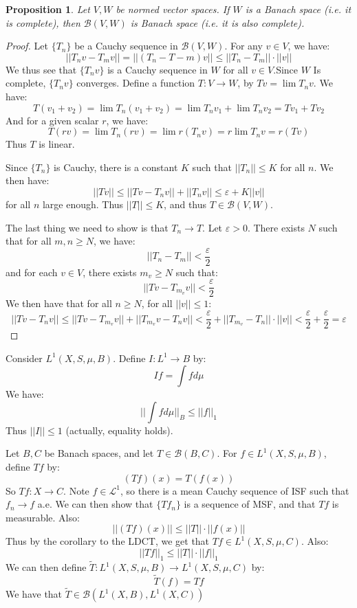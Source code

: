 \documentclass[a4paper,12pt]{report}
\newcommand{\ms}[1]{\mathscr{#1}}
\newcommand{\varep}{ \varepsilon }
\newtheorem{prop}[theorem]{Proposition}
\newenvironment{example}[1][Example.]{\begin{trivlist}
\item[\hskip \labelsep {\bfseries #1}]}{\end{trivlist}}
\begin{document}
	\begin{prop}
	Let $V, W$ be normed vector spaces. If $W$ is a Banach space (i.e. it is complete), then $\ms{B}(V, W)$ is Banach space (i.e. it is also complete).
	\end{prop}
	\begin{proof}
	Let $\{T_n\}$ be a Cauchy sequence in $\ms{B}(V, W)$. For any $v \in V$, we have:
	\[ ||T_nv - T_mv|| = ||(T_n - T-m)v|| \leq ||T_n - T_m|| \cdot ||v|| \]
	We thus see that $\{T_n v\}$ is a Cauchy sequence in $W$ for all $v \in V$.Since $W$ Is complete, $\{T_n v\}$ converges. Define a function $T : V \rightarrow W$, by $Tv = \lim T_n v$. We have:
	\[ T(v_1 + v_2) = \lim T_n(v_1 + v_2) = \lim T_nv_1 + \lim T_nv_2 = Tv_1 + Tv_2 \]
	And for a given scalar $r$, we have:
	\[ T(rv) = \lim T_n(rv) = \lim r(T_nv) = r \lim T_nv = r(Tv) \]
	Thus $T$ is linear.
	
	Since $\{T_n\}$ is Cauchy, there is a constant $K$ such that $||T_n|| \leq K$ for all $n$. We then have:
	\[ ||Tv|| \leq ||Tv - T_nv|| + ||T_nv|| \leq \varep + K||v|| \]
	for all $n$ large enough. Thus $||T|| \leq K$, and thus $T \in \ms{B}(V, W)$. 
	
	The last thing we need to show is that $T_n \rightarrow T$. Let $\varep > 0$. There exists $N$ such that for all $m, n \geq N$, we have:
	\[ ||T_n - T_m|| < \frac{\varep}{2} \]
	and for each $v \in V$, there exists $m_v \geq N$ such that:
	\[ ||Tv - T_{m_v}v|| < \frac{\varep}{2} \]
	We then have that for all $n \geq N$, for all $||v|| \leq 1$:
	\[ ||Tv - T_n v|| \leq ||Tv - T_{m_v}v|| + ||T_{m_v}v - T_nv|| < \frac{\varep}{2} + ||T_{m_v} - T_n|| \cdot ||v|| < \frac{\varep}{2} + \frac{\varep}{2} = \varep \]
	\end{proof}
	
	\begin{example}
	Consider $L^1(X, S, \mu, B)$. Define $I : L^1 \rightarrow B$ by:
	\[ If = \int f  d\mu \]
	We have:
	\[ ||\int f d\mu ||_B \leq ||f||_1 \]
	Thus $||I|| \leq 1$ (actually, equality holds).
	\end{example}

	\begin{example}
	Let $B, C$ be Banach spaces, and let $T \in \ms{B}(B, C)$. For $f \in L^1(X, S, \mu, B)$, define $Tf$ by:
	\[ (Tf)(x) = T(f(x)) \]
	So $Tf : X \rightarrow C$. Note $f \in \ms{L}^1$, so there is a mean Cauchy sequence of ISF such that $f_n \rightarrow f$ a.e. We can then show that $\{Tf_n\}$ is a sequence of MSF, and that $Tf$ is measurable. Also:
	\[ ||(Tf)(x)|| \leq ||T|| \cdot ||f(x)|| \]
	Thus by the corollary to the LDCT, we get that $Tf \in L^1(X, S, \mu, C)$. Also:
	\[ ||Tf||_1 \leq ||T|| \cdot ||f||_1 \]
	We can then define $\tilde{T} : L^1(X, S, \mu, B) \rightarrow L^1(X, S, \mu, C)$ by:
	\[ \tilde{T}(f) = Tf \]
	We have that $\tilde{T} \in \ms{B}(L^1(X, B), L^1(X, C))$
	\end{example}	
	
\end{document}
